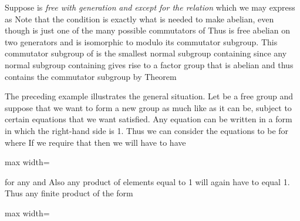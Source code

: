\documentclass[11pt,oneside]{article}
\begin{document}
\begin{BookBody}

 Suppose  is\textit{ free with generation}  \textit{and}  \textit{except for the relation}  which we may express as  Note that the condition  is exactly what is needed to make  abelian, even though  is just one of the many possible commutators of  Thus  is free abelian on two generators and is isomorphic to  modulo its commutator subgroup. This commutator subgroup of  is the smallest normal subgroup containing  since any normal subgroup containing  gives rise to a factor group that is abelian and thus contains the commutator subgroup by Theorem \BookEnd{\blacktriangle}

The preceding example illustrates the general situation. Let  be a free group and suppose that we want to form a new group as much like  as it can be, subject to certain equations that we want satisfied. Any equation can be written in a form in which the right-hand side is 1. Thus we can consider the equations to be  for  where  If we require that  then we will have to have

\begin{center}\begin{adjustbox}{max width=\linewidth}\end{adjustbox}\end{center}

\noindent for any  and  Also any product of elements equal to 1 will again have to equal 1. Thus any finite product of the form

\begin{center}\begin{adjustbox}{max width=\linewidth}\end{adjustbox}\end{center}


\end{BookBody}
\end{document}
